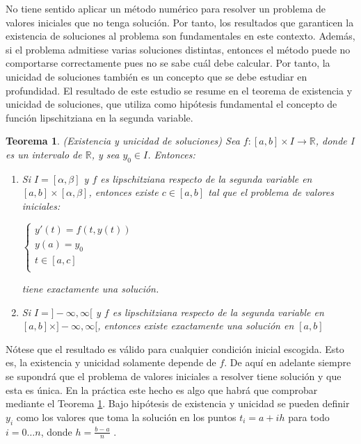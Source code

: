 \documentclass{article}
\theoremstyle{theorem-style}  %
\newtheorem{theorem}{Teorema}[section]  %
\theoremstyle{definition-style}
\theoremstyle{example-style}
\begin{document}
	No tiene sentido aplicar un método numérico para resolver un problema de valores iniciales que no tenga solución. Por tanto, los resultados que garanticen la existencia de soluciones al problema son fundamentales en este contexto. Además, si el problema admitiese varias soluciones distintas, entonces el método puede no comportarse correctamente pues no se sabe cuál debe calcular. Por tanto, la unicidad de soluciones también es un concepto que se debe estudiar en profundidad. El resultado de este estudio se resume en el teorema de existencia y unicidad de soluciones, que utiliza como hipótesis fundamental el concepto de función lipschitziana en la segunda variable.
	
	\begin{theorem} \label{theorem:existence-uniqueness}
		(Existencia y unicidad de soluciones) Sea $f: [a,b] \times I \rightarrow \mathbb{R}$, donde I es un intervalo de $\mathbb{R}$, y sea $y_0 \in I$. Entonces:
		\begin{enumerate}
			\item Si $I = [\alpha,\beta]$ y $f$ es lipschitziana respecto de la segunda variable en $[a,b]\times[\alpha,\beta]$, entonces existe $c \in [a,b]$ tal que el problema de valores iniciales:
			\begin{center}
				$\begin{cases}
				y'(t) = f(t,y(t)) \\
				y(a) = y_0 \\
				t \in [a,c] \\
				\end{cases}$
			\end{center}
			tiene exactamente una solución. 
			\item Si $I = ]-\infty,\infty[$ y $f$ es lipschitziana respecto de la segunda variable en $[a,b]\times]-\infty,\infty[$, entonces existe exactamente una solución en $[a,b]$	
		\end{enumerate}
	\end{theorem}
 
	Nótese que el resultado es válido para cualquier condición inicial escogida. Esto es, la existencia y unicidad solamente depende de $f$. De aquí en adelante siempre se supondrá que el problema de valores iniciales a resolver tiene solución y que esta es única. En la práctica este hecho es algo que habrá que comprobar mediante el Teorema \ref{theorem:existence-uniqueness}. Bajo hipótesis de existencia y unicidad se pueden definir $y_i$ como los valores que toma la solución en los puntos $t_i = a + ih$ para todo $i = 0 \ldots n$, donde $h = \frac{b-a}{n}$ .
 
\end{document}
